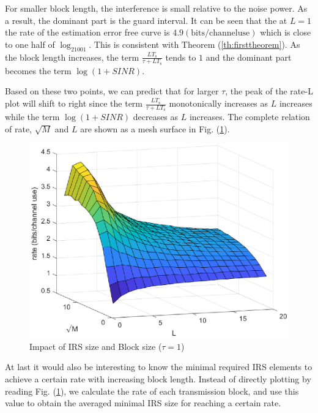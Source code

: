 \documentclass[12pt,draftclsnofoot,onecolumn,journal]{IEEEtran}
\begin{document}
 For smaller block length, the interference is small relative to the noise power. As a result, the dominant part is the guard interval. It can be seen that the at $L=1$ the rate of the estimation error free curve is $4.9 (\mathrm{bits/channel use})$ which is close to one half of $\log_21001$. This is consistent with Theorem (\ref{th:firsttheorem}). As the block length increases, the term $\frac{LT_{\mathrm{s}}}{\tau+LT_{\mathrm{s}}}$ tends to $1$ and the dominant part becomes the term $\log(1+SINR)$. 

Based on these two points, we can predict that for larger $\tau$, the peak of the rate-L plot will shift to right since the term $\frac{LT_{\mathrm{s}}}{\tau+LT_{\mathrm{s}}}$ monotonically increases as $L$ increases while the term $\log(1+SINR)$ decreases as $L$ increases. The complete relation of rate, $\sqrt M$ and $L$ are shown as a mesh surface in Fig. (\ref{fig:fullrelation3d}).
\begin{figure}[htbp]
 \includegraphics[width=6in]{threed.eps}
  \caption{Impact of IRS size and Block size ($\tau=1$)}
  \label{fig:fullrelation3d}
\end{figure}

At last it would also be interesting to know the minimal required IRS elements to achieve a certain rate with increasing block length. Instead of directly plotting by reading Fig. (\ref{fig:fullrelation3d}), we calculate the rate of each transmission block, and use this value to obtain the averaged minimal IRS size for reaching a certain rate. 
\end{document}
